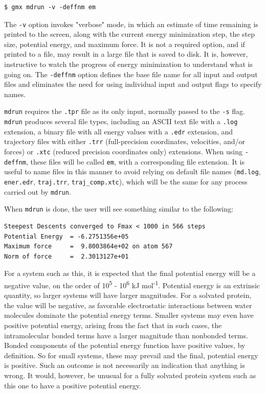 \documentclass[9pt,tutorial,pubversion]{livecoms}
\begin{document}
\begin{lstlisting}
$ gmx mdrun -v -deffnm em
\end{lstlisting}
%
The \texttt{-v} option invokes "verbose" mode, in which an estimate of time remaining is printed to the screen, along with the current energy minimization step, the step size, potential energy, and maximum force. It is not a required option, and if printed to a file, may result in a large file that is saved to disk. It is, however, instructive to watch the progress of energy minimization to understand what is going on. The \texttt{-deffnm} option defines the base file name for all input and output files and eliminates the need for using individual input and output flags to specify names. 

\texttt{mdrun} requires the \texttt{.tpr} file as its only input, normally passed to the \texttt{-s} flag. \texttt{mdrun} produces several file types, including an ASCII text file with a \texttt{.log} extension, a binary file with all energy values with a \texttt{.edr} extension, and trajectory files with either \texttt{.trr} (full-precision coordinates, velocities, and/or forces) or \texttt{.xtc} (reduced precision coordinates only) extensions. When using \texttt{-deffnm}, these files will be called \texttt{em}, with a corresponding file extension. It is useful to name files in this manner to avoid relying on default file names (\texttt{md.log}, \texttt{ener.edr}, \texttt{traj.trr}, \texttt{traj\_comp.xtc}), which will be the same for any process carried out by \texttt{mdrun}.

When \texttt{mdrun} is done, the user will see something similar to the following:

\begin{lstlisting}[basicstyle=\footnotesize\ttfamily]
Steepest Descents converged to Fmax < 1000 in 566 steps
Potential Energy  = -6.2751356e+05
Maximum force     =  9.8003864e+02 on atom 567
Norm of force     =  2.3013127e+01
\end{lstlisting}

For a system such as this, it is expected that the final potential energy will be a negative value, on the order of 10\textsuperscript{5} - 10\textsuperscript{6} kJ mol\textsuperscript{-1}. Potential energy is an extrinsic quantity, so larger systems will have larger magnitudes. For a solvated protein, the value will be negative, as favorable electrostatic interactions between water molecules dominate the potential energy terms. Smaller systems may even have positive potential energy, arising from the fact that in such cases, the intramolecular bonded terms have a larger magnitude than nonbonded terms. Bonded components of the potential energy function have positive values, by definition. So for small systems, these may prevail and the final, potential energy is positive. Such an outcome is not necessarily an indication that anything is wrong. It would, however, be unusual for a fully solvated protein system such as this one to have a positive potential energy.
\end{document}
